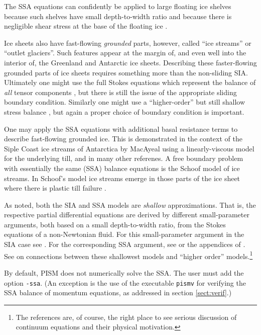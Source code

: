 \documentclass[11pt,final]{amsart}
\newcommand{\pismoptionindex}[1]{\index{options for PISM (and PETSc)!\texttt{-#1}}}
\newcommand{\intextoption}[1]{\texttt{-#1}\pismoptionindex{#1}}
\begin{document}
The SSA equations can confidently be applied to large floating ice shelves because such shelves have small depth-to-width ratio and because there is negligible shear stress at the base of the floating ice \cite{Morland,MorlandZainuddin}.

Ice sheets also have fast-flowing \emph{grounded} parts, however, called ``ice streams'' or ``outlet glaciers''.  Such features appear at the margin of, and even well into the interior of, the Greenland \cite{Joughinetal2001} and Antarctic \cite{BamberVaughanJoughin} ice sheets.  Describing these faster-flowing grounded parts of ice sheets requires something more than the non-sliding SIA.  Ultimately one might use the full Stokes equations which represent the balance of \emph{all} tensor components \cite{Fowler}, but there is still the issue of the appropriate sliding boundary condition.  Similarly one might use a ``higher-order'' but still shallow stress balance \cite{Blatter,Pattyn03}, but again a proper choice of boundary condition is important.

One may apply the SSA equations with additional basal resistance terms to describe fast-flowing grounded ice.  This is demonstrated in the context of the Siple Coast ice streams of Antarctica by MacAyeal \cite{MacAyeal,HulbeMacAyeal} using a linearly-viscous model for the underlying till, and in many other referenes.  A free boundary problem with essentially the same (SSA) balance equations is the Schoof \cite{SchoofStream} model of ice streams.  In Schoof's model ice streams emerge in those parts of the ice sheet where there is plastic till failure \cite{Paterson}.

As noted, both the SIA and SSA models are \emph{shallow} approximations.  That is, the respective partial differential equations are derived by different small-parameter arguments, both based on a small depth-to-width ratio, from the Stokes equations of a non-Newtonian fluid.  For this small-parameter argument in the SIA case see \cite{Fowler}.  For the corresponding SSA argument, see \cite{WeisGreveHutter} or the appendices of \cite{SchoofStream}.  See \cite{SchoofHindmarsh} on connections between these shallowest models and ``higher order'' models.\footnote{The references are, of course, the right place to see serious discussion of continuum equations and their physical motivation.}

By default, PISM does not numerically solve the SSA.  The user must add the option \intextoption{ssa}.  (An exception is the use of the executable \verb|pismv| for verifying the SSA balance of momentum equations, as addressed in section \ref{sect:verif}.)
\end{document}
